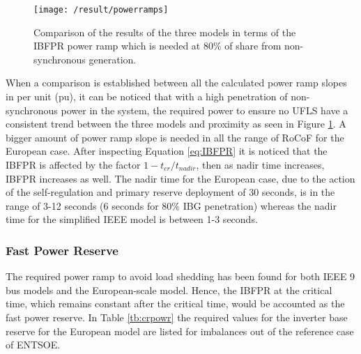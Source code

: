 \begin{figure}[h]
	\centering
	\texttt{[image: /result/powerramps]}
	\caption{Comparison of the results of the three models in terms of the IBFPR power ramp which is needed at 80\% of share from non-synchronous generation.}
	\label{fig:res_pramp}
\end{figure}

When a comparison is established between all the calculated power ramp slopes in per unit (pu), it can be noticed that with a high penetration of non-synchronous power in the system, the required power to ensure no UFLS have a consistent trend between the three models and proximity as seen in Figure \ref{fig:res_pramp}. A bigger amount of power ramp slope is needed in all the range of RoCoF for the European case. After inspecting Equation \ref{eq:IBFPR} it is noticed that the IBFPR is affected by the factor $ 1-t_{cr} /t_{nadir} $, then as nadir time increases, IBFPR increases as well. The nadir time for the European case, due to the action of the self-regulation and primary reserve deployment of 30 seconds, is in the range of 3-12 seconds (6 seconds for 80\% IBG penetration) whereas the nadir time for the simplified IEEE model is between 1-3 seconds.



\subsubsection{Fast Power Reserve}


The required power ramp to avoid load shedding has been found for both IEEE 9 bus models and the European-scale model. Hence, the IBFPR at the critical time, which remains constant after the critical time, would be accounted as the fast power reserve. In Table \ref{tb:crpowr} the required values for the inverter base reserve for the European model are listed for imbalances out of the reference case of ENTSOE.\\

